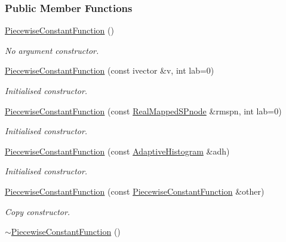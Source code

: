 \subsubsection*{\-Public \-Member \-Functions}
\begin{DoxyCompactItemize}
\item 
\hyperlink{classsubpavings_1_1PiecewiseConstantFunction_a5532cf41ae985d1de4601826f6fd33c7}{\-Piecewise\-Constant\-Function} ()
\begin{DoxyCompactList}\small\item\em \-No argument constructor. \end{DoxyCompactList}\item 
\hyperlink{classsubpavings_1_1PiecewiseConstantFunction_a4642d25f6dc9d2f4d6f31d9ff81f3741}{\-Piecewise\-Constant\-Function} (const ivector \&v, int lab=0)
\begin{DoxyCompactList}\small\item\em \-Initialised constructor. \end{DoxyCompactList}\item 
\hyperlink{classsubpavings_1_1PiecewiseConstantFunction_adb90004f77b865413b3c66878422c53a}{\-Piecewise\-Constant\-Function} (const \hyperlink{classsubpavings_1_1RealMappedSPnode}{\-Real\-Mapped\-S\-Pnode} \&rmspn, int lab=0)
\begin{DoxyCompactList}\small\item\em \-Initialised constructor. \end{DoxyCompactList}\item 
\hyperlink{classsubpavings_1_1PiecewiseConstantFunction_a00b18c179aab77dba47a6a6df9c5684f}{\-Piecewise\-Constant\-Function} (const \hyperlink{classsubpavings_1_1AdaptiveHistogram}{\-Adaptive\-Histogram} \&adh)
\begin{DoxyCompactList}\small\item\em \-Initialised constructor. \end{DoxyCompactList}\item 
\hyperlink{classsubpavings_1_1PiecewiseConstantFunction_a7bfe6205559abfdfe8bce89f7ae90760}{\-Piecewise\-Constant\-Function} (const \hyperlink{classsubpavings_1_1PiecewiseConstantFunction}{\-Piecewise\-Constant\-Function} \&other)
\begin{DoxyCompactList}\small\item\em \-Copy constructor. \end{DoxyCompactList}\item 
\hyperlink{classsubpavings_1_1PiecewiseConstantFunction_a16194266ecbed94003ea484cb8b70610}{$\sim$\-Piecewise\-Constant\-Function} ()

\end{DoxyCompactItemize}
